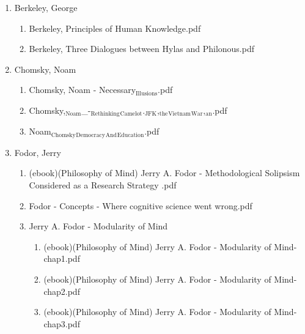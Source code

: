\documentclass[11pt]{article}
\begin{document}
\begin{enumerate}
\begin{enumerate}
\begin{enumerate}
\begin{enumerate}
\begin{enumerate}
\begin{enumerate}
\item Berkeley, George
\label{sec-1-1-1-1-7-3-39-13-30}
\begin{enumerate}
\item Berkeley, Principles of Human Knowledge.pdf
\label{sec-1-1-1-1-7-3-39-13-30-1}

\item Berkeley, Three Dialogues between Hylas and Philonous.pdf
\label{sec-1-1-1-1-7-3-39-13-30-2}
\end{enumerate}

\item Chomsky, Noam
\label{sec-1-1-1-1-7-3-39-13-31}
\begin{enumerate}
\item Chomsky, Noam - Necessary$_{\text{Illusions}}$.pdf
\label{sec-1-1-1-1-7-3-39-13-31-1}

\item Chomsky,$_{\text{Noam}}$\_-$_{\text{Rethinking}}$$_{\text{Camelot}}$.$_{\text{JFK}}$,$_{\text{the}}$$_{\text{Vietnam}}$$_{\text{War}}$,$_{\text{an}}$.pdf
\label{sec-1-1-1-1-7-3-39-13-31-2}

\item Noam$_{\text{Chomsky}}$$_{\text{Democracy}}$$_{\text{And}}$$_{\text{Education}}$.pdf
\label{sec-1-1-1-1-7-3-39-13-31-3}
\end{enumerate}

\item Fodor, Jerry
\label{sec-1-1-1-1-7-3-39-13-32}
\begin{enumerate}
\item (ebook)(Philosophy of Mind) Jerry A. Fodor - Methodological Solipsism Considered as a Research Strategy .pdf
\label{sec-1-1-1-1-7-3-39-13-32-1}

\item Fodor - Concepts - Where cognitive science went wrong.pdf
\label{sec-1-1-1-1-7-3-39-13-32-2}

\item Jerry A. Fodor - Modularity of Mind
\label{sec-1-1-1-1-7-3-39-13-32-3}
\begin{enumerate}
\item (ebook)(Philosophy of Mind) Jerry A. Fodor - Modularity of Mind-chap1.pdf
\label{sec-1-1-1-1-7-3-39-13-32-3-1}

\item (ebook)(Philosophy of Mind) Jerry A. Fodor - Modularity of Mind-chap2.pdf
\label{sec-1-1-1-1-7-3-39-13-32-3-2}

\item (ebook)(Philosophy of Mind) Jerry A. Fodor - Modularity of Mind-chap3.pdf
\label{sec-1-1-1-1-7-3-39-13-32-3-3}


\end{enumerate}
\end{enumerate}
\end{enumerate}
\end{enumerate}
\end{enumerate}
\end{enumerate}
\end{enumerate}
\end{enumerate}
\end{document}

